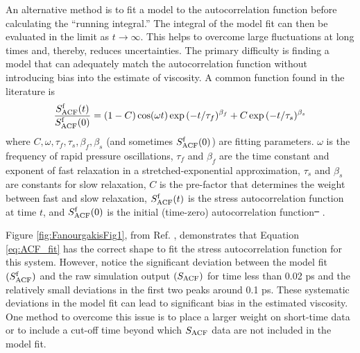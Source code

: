 \documentclass[9pt,bestpractices]{livecoms}
\providecommand{\DIFadd}[1]{{\protect\color{blue}\uwave{#1}}} %
\providecommand{\DIFdel}[1]{{\protect\color{red}\sout{#1}}}                      %
\providecommand{\DIFaddbegin}{} %
\providecommand{\DIFaddend}{} %
\providecommand{\DIFdelbegin}{} %
\providecommand{\DIFdelend}{} %
\begin{document}
An alternative method is to fit a model to the autocorrelation function before calculating the ``running integral.'' The integral of the model fit can then be evaluated in the limit as $t \to \infty$. This helps to overcome large fluctuations at long times and, thereby, reduces uncertainties. The primary difficulty is finding a model that can adequately match the autocorrelation function without introducing bias into the estimate of viscosity. A common function found in the literature is \DIFaddbegin \DIFadd{\mbox{%
\cite{GROMACS,GUANG2002}
}\hspace{0pt}%
}\DIFaddend \begin{equation} \label{eq:ACF_fit}
\frac{S^{\rm f}_{\rm ACF}(t)}{S^{\rm f}_{\rm ACF}(0)} = (1-C)\cos(\omega t)\exp{(-t/\tau_f)^{\beta_f}} + C\exp{(-t/\tau_s)^{\beta_s}}
\end{equation}
where $C, \omega, \tau_f, \tau_s, \beta_f, \beta_s$ (and sometimes $S^{\rm f}_{\rm ACF}(0)$) are fitting parameters. \DIFaddbegin \DIFadd{Specifically, }\DIFaddend $\omega$ is the frequency of rapid pressure oscillations, $\tau_f$ and $\beta_f$ are the time constant and exponent of fast relaxation in a stretched-exponential approximation, $\tau_s$ and $\beta_s$ are constants for slow relaxation, $C$ is the pre-factor that determines the weight between fast and slow relaxation, $S^{\rm f}_{\rm ACF}(t)$ is the stress autocorrelation function at time $t$, and $S^{\rm f}_{\rm ACF}(0)$ is the initial (time-zero) autocorrelation function\DIFdelbegin \DIFdel{\mbox{%
\cite{GROMACS}}\hspace{0pt}%
}\DIFdelend .


Figure \ref{fig:FanourgakisFig1}, from Ref. \cite{Fanourgakis2012}, demonstrates that Equation \ref{eq:ACF_fit} has the correct shape to fit the stress autocorrelation function for this system. However, notice the significant deviation between the model fit $(S^{\rm f}_{\rm ACF})$ and the raw simulation output $(S_{\rm ACF})$ for time less than 0.02 ps and the relatively small deviations in the first two peaks around 0.1 ps. These systematic deviations in the model fit can lead to significant bias in the estimated viscosity. One method to overcome this issue is to place a larger weight on short-time data or to include a cut-off time beyond which $S_{\rm ACF}$ data are not included in the model fit.
\end{document}
